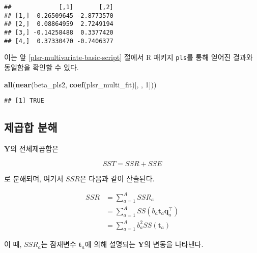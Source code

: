 \documentclass[]{book}
\newenvironment{Shaded}{\begin{snugshade}}{\end{snugshade}}
\newcommand{\DecValTok}[1]{\textcolor[rgb]{0.00,0.00,0.81}{#1}}
\newcommand{\KeywordTok}[1]{\textcolor[rgb]{0.13,0.29,0.53}{\textbf{#1}}}
\newcommand{\NormalTok}[1]{#1}
\newcommand{\OperatorTok}[1]{\textcolor[rgb]{0.81,0.36,0.00}{\textbf{#1}}}
\newcommand{\StringTok}[1]{\textcolor[rgb]{0.31,0.60,0.02}{#1}}
\begin{document}
\begin{verbatim}
##             [,1]       [,2]
## [1,] -0.26509645 -2.8773570
## [2,]  0.08864959  2.7249194
## [3,] -0.14258488  0.3377420
## [4,]  0.37330470 -0.7406377
\end{verbatim}

이는 앞 \ref{plsr-multivariate-basic-script} 절에서 R 패키지 \texttt{pls}를 통해 얻어진 결과와 동일함을 확인할 수 있다.

\begin{Shaded}
\begin{Highlighting}[]
\KeywordTok{all}\NormalTok{(}\KeywordTok{near}\NormalTok{(beta_pls2, }\KeywordTok{coef}\NormalTok{(plsr_multi_fit)[, , }\DecValTok{1}\NormalTok{]))}
\end{Highlighting}
\end{Shaded}

\begin{verbatim}
## [1] TRUE
\end{verbatim}

\hypertarget{plsr-multivariate-sst}{%
\subsection{제곱합 분해}\label{plsr-multivariate-sst}}

\(\mathbf{Y}\)의 전체제곱합은

\[SST = SSR + SSE\]

로 분해되며, 여기서 \(SSR\)은 다음과 같이 산출된다.

\begin{equation}
\begin{split}
SSR &= \sum_{a = 1}^{A} SSR_a\\
&= \sum_{a = 1}^{A} SS(b_a \mathbf{t}_a \mathbf{q}_a^\top)\\ 
&= \sum_{a = 1}^{A} b_a^2 SS(\mathbf{t}_a)
\end{split} \label{eq:plsr-multivariate-ssr}
\end{equation}

이 때, \(SSR_a\)는 잠재변수 \(\mathbf{t}_a\)에 의해 설명되는 \(\mathbf{Y}\)의 변동을 나타낸다.

\begin{Shaded}
\end{Shaded}
\end{document}
